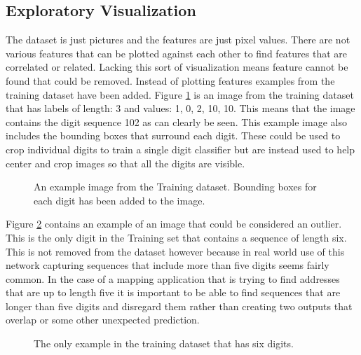 \documentclass[12pt,twocolumn,letterpaper]{article}
\begin{document}
\subsection{Exploratory Visualization}
The dataset is just pictures and the features are just pixel values. There are 
not various features that can be plotted against each other to find features that 
are correlated or related. Lacking this sort of visualization means feature cannot 
be found that could be removed. Instead of plotting features examples from the 
training dataset have been added. Figure \ref{fig:Original Figure} is an image from the training dataset that has labels 
of length: 3 and values: 1, 0, 2, 10, 10. This means that the image contains the 
digit sequence 102 as can clearly be seen. This example image also includes the
bounding boxes that surround each digit. These could be used to crop individual 
digits to train a single digit classifier but are instead used to help center and 
crop images so that all the digits are visible.

\begin{figure}[t]
\begin{center}
\end{center}
   \caption{An example image from the Training dataset. Bounding boxes for each
   			digit has been added to the image.}
\label{fig:Original Figure}
\end{figure}

Figure \ref{fig:6 Digit Figure} contains an example of an image that could be considered an outlier. 
This is the only digit in the Training set that contains a sequence of length 
six. This is not removed from the dataset however because in real world use of 
this network capturing sequences that include more than five digits seems fairly 
common. In the case of a mapping application that is trying to find addresses 
that are up to length five it is important to be able to find sequences that are 
longer than five digits and disregard them rather than creating two outputs that 
overlap or some other unexpected prediction.

\begin{figure}[t]
\begin{center}
\end{center}
   \caption{The only example in the training dataset that has six digits.}
\label{fig:6 Digit Figure}
\end{figure}
\end{document}
